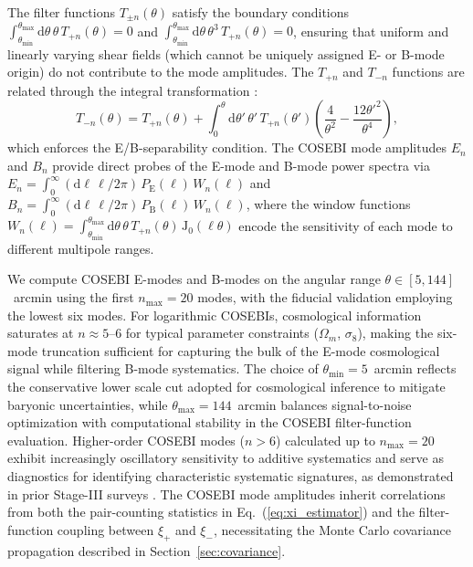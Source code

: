 \documentclass{aa}
\begin{document}
The filter functions $T_{\pm n}(\theta)$ satisfy the boundary conditions $\int_{\theta_{\mathrm{min}}}^{\theta_{\mathrm{max}}} \mathrm{d}\theta \, \theta \, T_{+n}(\theta) = 0$ and $\int_{\theta_{\mathrm{min}}}^{\theta_{\mathrm{max}}} \mathrm{d}\theta \, \theta^3 \, T_{+n}(\theta) = 0$, ensuring that uniform and linearly varying shear fields (which cannot be uniquely assigned E- or B-mode origin) do not contribute to the mode amplitudes. The $T_{+n}$ and $T_{-n}$ functions are related through the integral transformation \citep{schneider.eifler.krause10}:
\begin{equation}
T_{-n}(\theta) = T_{+n}(\theta) + \int_0^\theta \mathrm{d}\theta' \, \theta' \, T_{+n}(\theta') \left(\frac{4}{\theta^2} - \frac{12\theta'^2}{\theta^4}\right),
\label{eq:Tpm_relation}
\end{equation}
which enforces the E/B-separability condition. The COSEBI mode amplitudes $E_n$ and $B_n$ provide direct probes of the E-mode and B-mode power spectra via $E_n = \int_0^\infty (\mathrm{d}\ell \, \ell / 2\pi) \, P_{\mathrm{E}}(\ell) \, W_n(\ell)$ and $B_n = \int_0^\infty (\mathrm{d}\ell \, \ell / 2\pi) \, P_{\mathrm{B}}(\ell) \, W_n(\ell)$, where the window functions $W_n(\ell) = \int_{\theta_{\mathrm{min}}}^{\theta_{\mathrm{max}}} \mathrm{d}\theta \, \theta \, T_{+n}(\theta) \, \mathrm{J}_0(\ell\theta)$ encode the sensitivity of each mode to different multipole ranges.

We compute COSEBI E-modes and B-modes on the angular range $\theta \in [5, 144]$~arcmin using the first $n_{\mathrm{max}} = 20$ modes, with the fiducial validation employing the lowest six modes. For logarithmic COSEBIs, cosmological information saturates at $n \approx 5$--$6$ for typical parameter constraints ($\Omega_m$, $\sigma_8$), making the six-mode truncation sufficient for capturing the bulk of the E-mode cosmological signal while filtering B-mode systematics. The choice of $\theta_{\mathrm{min}} = 5$~arcmin reflects the conservative lower scale cut adopted for cosmological inference to mitigate baryonic uncertainties, while $\theta_{\mathrm{max}} = 144$~arcmin balances signal-to-noise optimization with computational stability in the COSEBI filter-function evaluation. Higher-order COSEBI modes ($n > 6$) calculated up to $n_{\mathrm{max}} = 20$ exhibit increasingly oscillatory sensitivity to additive systematics and serve as diagnostics for identifying characteristic systematic signatures, as demonstrated in prior Stage-III surveys \citep{asgari.etal20}. The COSEBI mode amplitudes inherit correlations from both the pair-counting statistics in Eq.~(\ref{eq:xi_estimator}) and the filter-function coupling between $\xi_+$ and $\xi_-$, necessitating the Monte Carlo covariance propagation described in Section~\ref{sec:covariance}.
\end{document}
